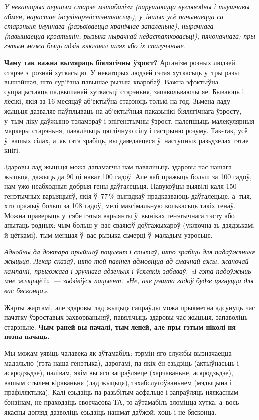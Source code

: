 \emph{У некаторых першым старэе мэтабалізм (парушаюцца вугляводны і тлушчавы абмен, нарастае інсулінарэзістэнтнасьць), у~іншых усё пачынаецца са старэньня імуннага (разьвіваецца хранічнае запаленьне), нырачнага (павышаецца крэатынін, рызыка нырачнай недастатковасьці), пячоначнага; пры гэтым можа быць адзін ключавы шлях або іх спалучэньне.}

\textbf{Чаму так важна вымяраць біялягічны ўзрост?} Арганізм розных людзей старэе з~рознай хуткасьцю. У некаторых людзей гэтая хуткасьць у~тры разы вышэйшая, што сур'ёзна павышае рызыкі хваробаў. Важна эфэктыўна супрацьстаяць падвышанай хуткасьці старэньня, запавольваючы яе. Бываюць і лёсікі, якія за 16 месяцаў аб'ектыўна старэюць толькі на год. Зьмена ладу жыцьця дазваляе паўплываць на аб'ектыўныя паказьнікі біялягічнага ўзросту, у~тым ліку даўжыню тэламэраў і эпігенэтычны ўзрост, палепшыць малекулярныя маркеры старэньня, павялічыць цяглічную сілу і гастрыню розуму. Так-так, усё ў~вашых сілах, а~як гэта зрабіць, вы даведаецеся ў~наступных разьдзелах гэтае кнігі.

Здаровы лад жыцьця можа дапамагчы нам павялічыць здаровы час нашага жыцьця, дажыць да 90 ці нават 100 гадоў. Але каб пражыць больш за 100 гадоў, нам ужо неабходныя добрыя гены даўгалецьця. Навукоўцы выявілі каля 150 генэтычных варыяцыяў, якія ў~77\,\% выпадкаў прадказваюць даўгалецьце, а~тыя, хто пражыў больш за 108 гадоў, мелі максімальную колькасьць такіх генаў. Можна праверыць у~сябе гэтыя варыянты ў~выніках генэтычнага тэсту або апытаць родных: чым больш у~вас сваякоў-доўгажыхароў (уключна зь дзядзькамі й цёткамі), тым меншая ў~вас рызыка сьмерці ў~маладым узросьце.

\emph{Аднойчы да доктара прыйшоў пацыент і спытаў, што зрабіць для падаўжэньня жыцьця. Лекар сказаў, што той павінен адмовіцца ад смачнай ежы, жаночай кампаніі, прыгожага і зручнага адзеньня і ўсялякіх забаваў. «І гэта падоўжыць мне жыцьцё?»~--- зьдзівіўся пацыент. «Не, але рэшта гадоў будзе цягнуцца для вас бясконца».}

Жарты жартамі, але здаровы лад жыцьця сапраўды можа прыкметна адсунуць час пачатку ўзроставых захворваньняў, павялічыць здаровы час жыцьця, запаволіць старэньне. \textbf{Чым раней вы пачалі, тым лепей, але пры гэтым ніколі ня позна пачаць.}

Мы можам уявіць чалавека як аўтамабіль: тэрмін яго службы вызначаецца мадэльлю (гэта наша генэтыка), дарогамі, па якіх ён езьдзіць (актыўнасьць і асяродзьдзе), палівам, якім вы яго запраўляеце (харчаваньне, асяродзьдзе), вашым стылем кіраваньня (лад жыцьця), тэхабслугоўваньнем (мэдыцына і прафіляктыка). Калі езьдзіць па разьбітым асфальце і запраўляць няякасным бэнзінам, не праходзіць своечасова ТА, то аўтамабіль зломіцца хутка, а~вось якасны догляд дазволіць езьдзіць нашмат даўжэй, хоць і не бясконца.

